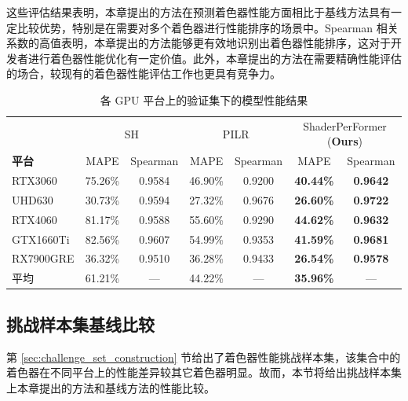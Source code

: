 这些评估结果表明，{\amend 本章提出的方法}在预测着色器性能方面相比于基线方法具有一定比较优势，特别是在需要对多个着色器进行性能排序的场景中。Spearman 相关系数的高值表明，{\amend 本章提出的方法}能够更有效地识别出着色器性能排序，这对于开发者进行着色器性能优化有一定价值。此外，{\amend 本章提出的方法}在需要精确性能评估的场合，较现有的着色器性能评估工作也更具有竞争力。

\begin{table}[h]
    \centering
    \caption{各 GPU 平台上的验证集下的模型性能结果}
    \label{table:mainResults}
    \begin{tabular}{l|cccccc}
    \toprule
        ~  & \multicolumn{2}{c}{SH} & \multicolumn{2}{c}{PILR} & \multicolumn{2}{c}{ShaderPerFormer (\textbf{Ours})} \\ 
        \textbf{平台}          & MAPE & Spearman & MAPE & Spearman & MAPE & Spearman \\
    \midrule
        RTX3060 &  75.26\% & 0.9584 &  46.90\% & 0.9200 & \textbf{40.44\%} & \textbf{0.9642} \\
        UHD630 &  30.73\% & 0.9594 &  27.32\% & 0.9676 & \textbf{26.60\%} & \textbf{0.9722} \\
        RTX4060 &  81.17\% & 0.9588 &  55.60\% & 0.9290 & \textbf{44.62\%} & \textbf{0.9632} \\
        GTX1660Ti &  82.56\% & 0.9607 &  54.99\% & 0.9353 & \textbf{41.59\%} & \textbf{0.9681} \\
        RX7900GRE &  36.32\% & 0.9510 &  36.28\% & 0.9433 & \textbf{26.54\%} & \textbf{0.9578} \\
    \midrule
        平均 & 61.21\% & --- & 44.22\% & --- & \textbf{35.96\%} & --- \\
    \bottomrule
    \end{tabular}
\end{table}

\subsection{挑战样本集基线比较}

{\added 第 \ref{sec:challenge_set_construction} 节给出了着色器性能挑战样本集，该集合中的着色器在不同平台上的性能差异较其它着色器明显。故而，本节将给出挑战样本集上本章提出的方法和基线方法的性能比较。}

